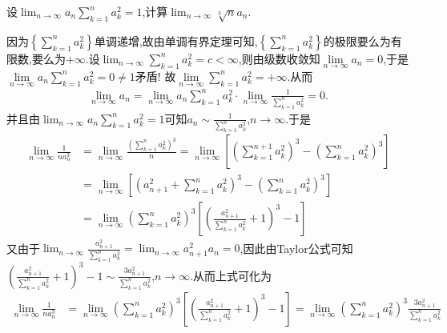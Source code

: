 \documentclass[../../main.tex]{subfiles}%
\begin{document}
\begin{example}
设\(\lim_{n \to \infty} a_n \sum\limits_{k = 1}^{n} a_{k}^{2} = 1\),计算\(\lim_{n \to \infty} \sqrt[3]{n}a_n\).
\end{example}
\begin{solution}
因为\(\left\{\sum\limits_{k = 1}^n{a_{k}^{2}}\right\}\)单调递增,故由单调有界定理可知,\(\left\{\sum\limits_{k = 1}^n{a_{k}^{2}}\right\}\)的极限要么为有限数,要么为\(+\infty\).设\(\lim_{n\rightarrow\infty}\sum\limits_{k = 1}^n{a_{k}^{2}}=c <\infty\),则由级数收敛知$\lim\limits_{n\rightarrow \infty}a_n=0$,于是$\lim\limits_{n\rightarrow \infty}a_n\sum_{k=1}^n{a_{k}^{2}}=0\ne 1$矛盾!
故$\lim\limits_{n\rightarrow \infty}\sum_{k=1}^n{a_{k}^{2}}=+\infty$.从而
\begin{align*}
\lim\limits_{n\rightarrow \infty}a_n=\lim\limits_{n\rightarrow \infty}a_n\sum_{k=1}^n{a_{k}^{2}}\cdot \lim\limits_{n\rightarrow \infty}\frac{1}{\sum\limits_{k=1}^n{a_{k}^{2}}}=0.
\end{align*}
并且由\(\lim_{n\rightarrow\infty}a_n\sum\limits_{k = 1}^n{a_{k}^{2}}=1\)可知\(a_n\sim\frac{1}{\sum\limits_{k = 1}^n{a_{k}^{2}}}\),\(n\rightarrow\infty\).于是
\begin{align*}
\lim_{n\rightarrow\infty}\frac{1}{na_{n}^{3}}&=\lim_{n\rightarrow\infty}\frac{\left(\sum\limits_{k = 1}^n{a_{k}^{2}}\right)^3}{n}=\lim_{n\rightarrow\infty}\left[\left(\sum\limits_{k = 1}^{n + 1}{a_{k}^{2}}\right)^3-\left(\sum\limits_{k = 1}^n{a_{k}^{2}}\right)^3\right]\\
&=\lim_{n\rightarrow\infty}\left[\left(a_{n + 1}^{2}+\sum\limits_{k = 1}^n{a_{k}^{2}}\right)^3-\left(\sum\limits_{k = 1}^n{a_{k}^{2}}\right)^3\right]\\
&=\lim_{n\rightarrow\infty}\left(\sum\limits_{k = 1}^n{a_{k}^{2}}\right)^3\left[\left(\frac{a_{n + 1}^{2}}{\sum\limits_{k = 1}^n{a_{k}^{2}}}+1\right)^3 - 1\right]
\end{align*}
又由于\(\lim_{n\rightarrow\infty}\frac{a_{n + 1}^{2}}{\sum\limits_{k = 1}^n{a_{k}^{2}}}=\lim_{n\rightarrow\infty}a_{n + 1}^{2}a_n = 0\),因此由Taylor公式可知\(\left(\frac{a_{n + 1}^{2}}{\sum\limits_{k = 1}^n{a_{k}^{2}}}+1\right)^3 - 1\sim\frac{3a_{n + 1}^{2}}{\sum\limits_{k = 1}^n{a_{k}^{2}}}\),\(n\rightarrow\infty\).从而上式可化为
\begin{align*}
\lim_{n\rightarrow\infty}\frac{1}{na_{n}^{3}}&=\lim_{n\rightarrow\infty}\left(\sum\limits_{k = 1}^n{a_{k}^{2}}\right)^3\left[\left(\frac{a_{n + 1}^{2}}{\sum\limits_{k = 1}^n{a_{k}^{2}}}+1\right)^3 - 1\right]=\lim_{n\rightarrow\infty}\left(\sum\limits_{k = 1}^n{a_{k}^{2}}\right)^3\frac{3a_{n + 1}^{2}}{\sum\limits_{k = 1}^n{a_{k}^{2}}}\\

\end{align*}
\end{solution}
\end{document}
